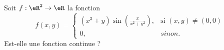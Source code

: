\begin{exercice}\label{exodevoir1-0005}

Soit $f: \eR^2\to \eR $ la fonction
\begin{equation}
  f(x,y)=\left\{
  \begin{array}{ll}
    (x^3+y)\sin\left(\frac{x}{x^2+y^2}\right), & \textrm{si } (x,y)\neq (0,0)\\
    0, & sinon. 
  \end{array}
  \right.
\end{equation}
Est-elle une fonction continue ? 
	
\end{exercice}
